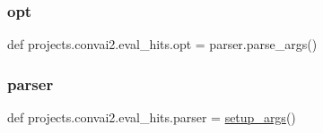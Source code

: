 \subsubsection{\texorpdfstring{opt}{opt}}
{\footnotesize\ttfamily def projects.\+convai2.\+eval\+\_\+hits.\+opt = parser.\+parse\+\_\+args()}

\mbox{\label{namespaceprojects_1_1convai2_1_1eval__hits_a51806c97f8cd28192b449237d5ade0d7}} 
\subsubsection{\texorpdfstring{parser}{parser}}
{\footnotesize\ttfamily def projects.\+convai2.\+eval\+\_\+hits.\+parser = \hyperlink{namespaceprojects_1_1convai2_1_1eval__hits_a276af35abce11628a8e697b370218cf4}{setup\+\_\+args}()}

